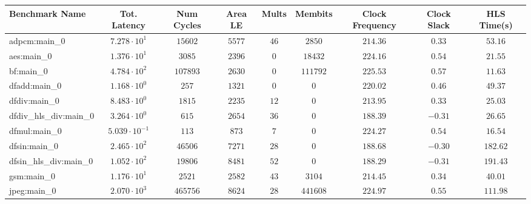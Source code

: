 \begin{tabular}{|l|c|c|c|c|c|c|c|c|}
\hline
Benchmark Name          & Tot. Latency            & Num Cycles & Area LE   & Mults   & Membits    & Clock Frequency & Clock Slack & HLS Time(s) \\
\hline
adpcm:main\_0           & $ 7.278 \cdot 10^{1}  $ & $ 15602  $ & $ 5577  $ & $ 46  $ & $ 2850   $ & $ 214.36      $ & $ 0.33    $ & $ 53.16   $ \\
aes:main\_0             & $ 1.376 \cdot 10^{1}  $ & $ 3085   $ & $ 2396  $ & $ 0   $ & $ 18432  $ & $ 224.16      $ & $ 0.54    $ & $ 21.55   $ \\
bf:main\_0              & $ 4.784 \cdot 10^{2}  $ & $ 107893 $ & $ 2630  $ & $ 0   $ & $ 111792 $ & $ 225.53      $ & $ 0.57    $ & $ 11.63   $ \\
dfadd:main\_0           & $ 1.168 \cdot 10^{0}  $ & $ 257    $ & $ 1321  $ & $ 0   $ & $ 0      $ & $ 220.02      $ & $ 0.46    $ & $ 49.37   $ \\
dfdiv:main\_0           & $ 8.483 \cdot 10^{0}  $ & $ 1815   $ & $ 2235  $ & $ 12  $ & $ 0      $ & $ 213.95      $ & $ 0.33    $ & $ 25.03   $ \\
dfdiv\_hls\_div:main\_0 & $ 3.264 \cdot 10^{0}  $ & $ 615    $ & $ 2654  $ & $ 36  $ & $ 0      $ & $ 188.39      $ & $ -0.31   $ & $ 26.65   $ \\
dfmul:main\_0           & $ 5.039 \cdot 10^{-1} $ & $ 113    $ & $ 873   $ & $ 7   $ & $ 0      $ & $ 224.27      $ & $ 0.54    $ & $ 16.54   $ \\
dfsin:main\_0           & $ 2.465 \cdot 10^{2}  $ & $ 46506  $ & $ 7271  $ & $ 28  $ & $ 0      $ & $ 188.68      $ & $ -0.30   $ & $ 182.62  $ \\
dfsin\_hls\_div:main\_0 & $ 1.052 \cdot 10^{2}  $ & $ 19806  $ & $ 8481  $ & $ 52  $ & $ 0      $ & $ 188.29      $ & $ -0.31   $ & $ 191.43  $ \\
gsm:main\_0             & $ 1.176 \cdot 10^{1}  $ & $ 2521   $ & $ 2582  $ & $ 43  $ & $ 3104   $ & $ 214.45      $ & $ 0.34    $ & $ 40.01   $ \\
jpeg:main\_0            & $ 2.070 \cdot 10^{3}  $ & $ 465756 $ & $ 8624  $ & $ 28  $ & $ 441608 $ & $ 224.97      $ & $ 0.55    $ & $ 111.98  $ \\

\end{tabular}
